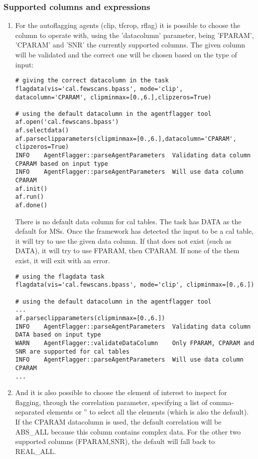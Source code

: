 \subsubsection{Supported columns and expressions}

\begin{enumerate}

\item For the autoflagging agents (clip, tfcrop, rflag) it is possible to
choose the column to operate with, using the 'datacolumn' parameter, being 'FPARAM',
'CPARAM' and 'SNR' the currently supported columns. The given column will be validated and the 
correct one will be chosen based on the type of input:

\begin{verbatim}
# giving the correct datacolumn in the task
flagdata(vis='cal.fewscans.bpass', mode='clip', datacolumn='CPARAM', clipminmax=[0.,6.],clipzeros=True)

# using the default datacolumn in the agentflagger tool
af.open('cal.fewscans.bpass')
af.selectdata()
af.parseclipparameters(clipminmax=[0.,6.],datacolumn='CPARAM', clipzeros=True)
INFO    AgentFlagger::parseAgentParameters  Validating data column CPARAM based on input type
INFO    AgentFlagger::parseAgentParameters  Will use data column CPARAM
af.init()
af.run()
af.done()

\end{verbatim}

There is no default data column for cal tables. The task has DATA as the default for MSs. Once the
framework has detected the input to be a cal table, it will try to use the given data column. If that
does not exist (such as DATA), it will try to use FPARAM, then CPARAM. If none of the them exist, it
will exit with an error.

\begin{verbatim}
# using the flagdata task
flagdata(vis='cal.fewscans.bpass', mode='clip', clipminmax=[0.,6.])

# using the default datacolumn in the agentflagger tool
...
af.parseclipparameters(clipminmax=[0.,6.])
INFO    AgentFlagger::parseAgentParameters  Validating data column DATA based on input type
WARN    AgentFlagger::validateDataColumn    Only FPARAM, CPARAM and SNR are supported for cal tables
INFO    AgentFlagger::parseAgentParameters  Will use data column CPARAM
...
\end{verbatim}

\item And it is also possible to choose the element of interest to inspect for
flagging, through the correlation parameter, specifying a list of comma-separated
elements or '' to select all the elements (which is also the default). If the CPARAM
datacolumn is used, the default correlation will be ABS\_ALL because this column contains 
complex data. For the other two supported columns (FPARAM,SNR), the default will fall 
back to REAL\_ALL.


\end{enumerate}
